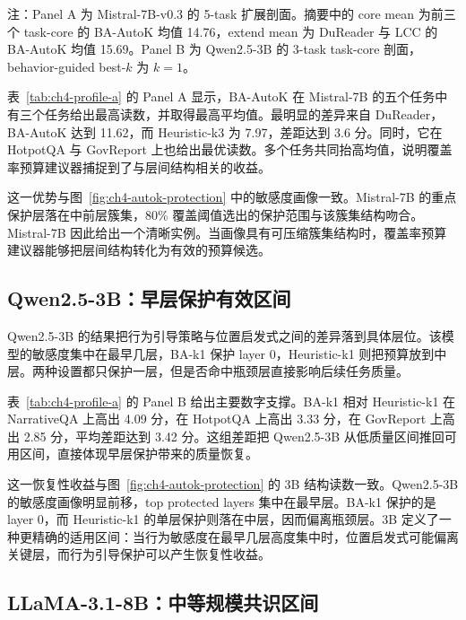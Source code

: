 \begin{table}[H]
{  \vspace{0.35em}
  \begin{minipage}{0.94\linewidth}
    \footnotesize
    注：Panel A 为 Mistral-7B-v0.3 的 5-task 扩展剖面。摘要中的 core mean 为前三个 task-core 的 BA-AutoK 均值 14.76，extend mean 为 DuReader 与 LCC 的 BA-AutoK 均值 15.69。Panel B 为 Qwen2.5-3B 的 3-task task-core 剖面，behavior-guided best-$k$ 为 $k=1$。
  \end{minipage}
  }
\end{table}

表~\ref{tab:ch4-profile-a} 的 Panel A 显示，BA-AutoK 在 Mistral-7B 的五个任务中有三个任务给出最高读数，并取得最高平均值。最明显的差异来自 DuReader，BA-AutoK 达到 11.62，而 Heuristic-k3 为 7.97，差距达到 3.6 分。同时，它在 HotpotQA 与 GovReport 上也给出最优读数。多个任务共同抬高均值，说明覆盖率预算建议器捕捉到了与层间结构相关的收益。

这一优势与图~\ref{fig:ch4-autok-protection} 中的敏感度画像一致。Mistral-7B 的重点保护层落在中前层簇集，80\% 覆盖阈值选出的保护范围与该簇集结构吻合。Mistral-7B 因此给出一个清晰实例。当画像具有可压缩簇集结构时，覆盖率预算建议器能够把层间结构转化为有效的预算候选。

\subsection{Qwen2.5-3B：早层保护有效区间}
\label{subsec:ch4-profile-qwen3b}
\label{subsec:exp-per-model-3b}

Qwen2.5-3B 的结果把行为引导策略与位置启发式之间的差异落到具体层位。该模型的敏感度集中在最早几层，BA-k1 保护 layer 0，Heuristic-k1 则把预算放到中层。两种设置都只保护一层，但是否命中瓶颈层直接影响后续任务质量。

表~\ref{tab:ch4-profile-a} 的 Panel B 给出主要数字支撑。BA-k1 相对 Heuristic-k1 在 NarrativeQA 上高出 4.09 分，在 HotpotQA 上高出 3.33 分，在 GovReport 上高出 2.85 分，平均差距达到 3.42 分。这组差距把 Qwen2.5-3B 从低质量区间推回可用区间，直接体现早层保护带来的质量恢复。

这一恢复性收益与图~\ref{fig:ch4-autok-protection} 的 3B 结构读数一致。Qwen2.5-3B 的敏感度画像明显前移，top protected layers 集中在最早层。BA-k1 保护的是 layer 0，而 Heuristic-k1 的单层保护则落在中层，因而偏离瓶颈层。3B 定义了一种更精确的适用区间：当行为敏感度在最早几层高度集中时，位置启发式可能偏离关键层，而行为引导保护可以产生恢复性收益。

\subsection{LLaMA-3.1-8B：中等规模共识区间}
\label{subsec:ch4-profile-llama8b}

